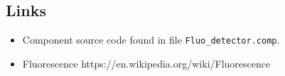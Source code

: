 \subsection*{Links}
\begin{itemize}
  \item Component source code found in file \texttt{Fluo\_detector.comp}.
  \item Fluorescence https://en.wikipedia.org/wiki/Fluorescence
\end{itemize}
